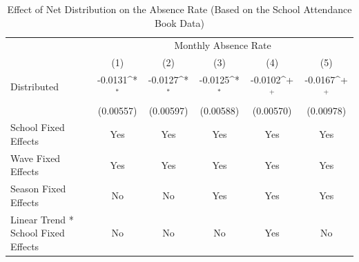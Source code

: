 \documentclass[fleqn,11pt]{article}
\newcommand{\sym}[1]{\rlap{$#1$}}
\def\sym#1{\ifmmode^{#1}\else\(^{#1}\)\fi
}
\begin{document}
\begin{table}[h]
\caption{Effect of Net Distribution on the Absence Rate (Based on the School Attendance
Book Data)}
\label{t:olsabsence_dailyattend_monthly_withtrend_child_app}\centering
\begin{adjustbox}{max width=\textwidth}
\begin{threeparttable}
\begin{tabular}{l*{5}{c}}
\hline\hline
&\multicolumn{5}{c}{Monthly Absence Rate}\\ \cmidrule(lr){2-6}
                    &\multicolumn{1}{c}{(1)}&\multicolumn{1}{c}{(2)}&\multicolumn{1}{c}{(3)}&\multicolumn{1}{c}{(4)}&\multicolumn{1}{c}{(5)}\\\hline
Distributed          &     -0.0131\sym{*}  &     -0.0127\sym{*}  &     -0.0125\sym{*}  &     -0.0102\sym{+}  &     -0.0167\sym{+}  \\
            &    (0.00557)         &     (0.00597)         &     (0.00588)         &     (0.00570)         &     (0.00978)         \\

School Fixed Effects           &         Yes         &         Yes         &         Yes         &         Yes         &         Yes         \\

Wave Fixed Effects            &         Yes         &         Yes         &         Yes         &         Yes         &         Yes         \\

Season Fixed Effects            &          No         &          No         &         Yes         &         Yes         &          Yes         \\

Linear Trend * School Fixed Effects &          No         &          No         &          No         &         Yes         &          No         \\


\end{tabular}
\end{threeparttable}
\end{adjustbox}
\end{table}
\end{document}
